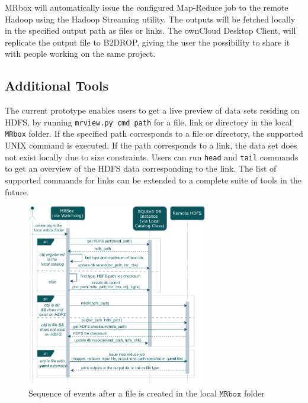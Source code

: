 MRbox will automatically issue the configured Map-Reduce job to the remote Hadoop using the Hadoop Streaming utility. The outputs will be fetched locally in the specified output path as files or links. The ownCloud Desktop Client, will replicate the output file to B2DROP, giving the user the possibility to share it with people working on the same project.

\subsection{Additional Tools}
The current prototype enables users to get a live preview of data sets residing on HDFS, by running \texttt{mrview.py cmd path} for a file, link or directory in the local \texttt{MRbox} folder. If the specified path corresponds to a file or directory, the supported UNIX command is executed. If the path corresponds to a link, the data set does not exist locally due to size constraints. Users can run \texttt{head} and \texttt{tail} commands to get an overview of the HDFS data corresponding to the link. The list of supported commands for links can be extended to a complete suite of tools in the future.

\begin{figure}
  \centering
  \includegraphics[width=\linewidth, height=8cm]{on_created_seq_sys.pdf}
  \caption{Sequence of events after a file is created in the local $\texttt{MRbox}$ folder}
\end{figure}

